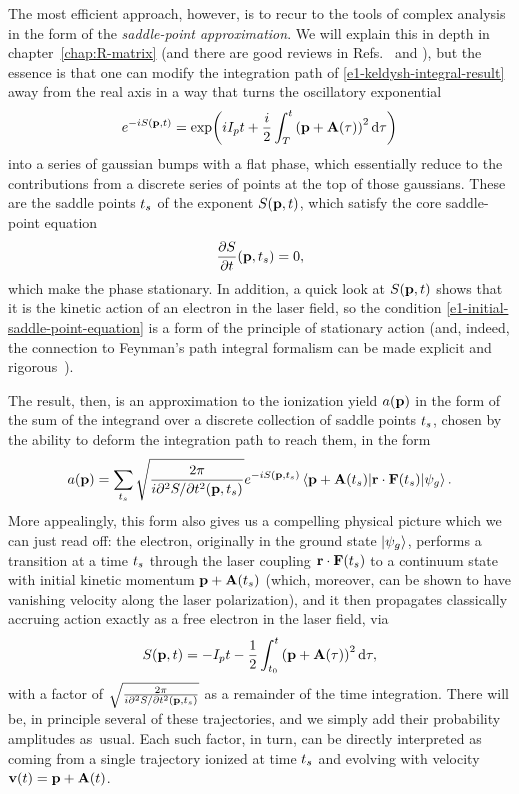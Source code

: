 The most efficient approach, however, is to recur to the tools of complex analysis in the form of the \textit{saddle-point approximation}. We will explain this in depth in chapter~\ref{chap:R-matrix} (and there are good reviews in Refs.~\citealp{popruzhenko_Keldysh_theory} and \citealp{Popov_imaginary_time}), but the essence is that one can modify the integration path of \eqref{e1-keldysh-integral-result} away from the real axis in a way that turns the oscillatory exponential 
\begin{equation}
e^{-iS(\vb{p},t)} = \exp({iI_p t+\frac i2 \int_{T}^{t} \left(\vb{p}+\vb{A}(\tau)\right)^2 \mathrm{d}\tau})
\label{e1-sfa-action}
\end{equation}
into a series of gaussian bumps with a flat phase, which essentially reduce to the contributions from a discrete series of points at the top of those gaussians. These are the saddle points ${t_s}$ of the exponent $S(\vb{p},t)$, which satisfy the core saddle-point equation
\begin{equation}
\frac{\partial S}{\partial t}(\vb{p},{t_s}) = 0,
\label{e1-initial-saddle-point-equation}
\end{equation}
which make the phase stationary. In addition, a quick look at $S(\vb{p},t)$ shows that it is the kinetic action of an electron in the laser field, so the condition \eqref{e1-initial-saddle-point-equation} is a form of the principle of stationary action (and, indeed, the connection to Feynman's path integral formalism can be made explicit and rigorous~\cite{salieres_quantum_orbits}).

The result, then, is an approximation to the ionization yield $a(\vb{p})$ in the form of the sum of the integrand over a discrete collection of saddle points ${t_s}$, chosen by the ability to deform the integration path to reach them, in the form
\begin{equation}
a(\vbp)
=
\sum_{\ts}
\sqrt{\frac{2\pi}{i\partial^2 S/\partial t^2(\vbp,\ts)}}
e^{-iS(\vbp,\ts)} 
\matrixel{\vbp+\vba(\ts)}{\vbr\cdot\vbf(\ts)}{\psi_g}
.
\label{e1-saddle-point-result}
\end{equation}
More appealingly, this form also gives us a compelling physical picture which we can just read off: the electron, originally in the ground state $\ket{\psi_g}$, performs a transition at a time ${t_s}$ through the laser coupling $\vb{r}\cdot\vb{F}({t_s})$ to a continuum state with initial kinetic momentum $\vb{p}+\vb{A}({t_s})$ (which, moreover, can be shown to have vanishing velocity along the laser polarization), and it then propagates classically accruing action exactly as a free electron in the laser field, via
\begin{equation}
S(\vb{p},t) =-I_p t-\frac 12 \int_{{t_0}}^{t} \left(\vb{p}+\vb{A}(\tau)\right)^2 \mathrm{d}\tau
,
\label{e1-sfa-action-real}
\end{equation}
with a factor of $\sqrt{\frac{2\pi}{i\partial^2 S/\partial t^2(\vb{p},{t_s})}}$ as a remainder of the time integration. There will be, in principle several  of these trajectories, and we simply add their probability amplitudes as~usual. Each such factor, in turn, can be directly interpreted as coming from a single trajectory ionized at time ${t_s}$ and evolving with velocity $\vb{v}(t)=\vb{p}+\vb{A}(t)$.


